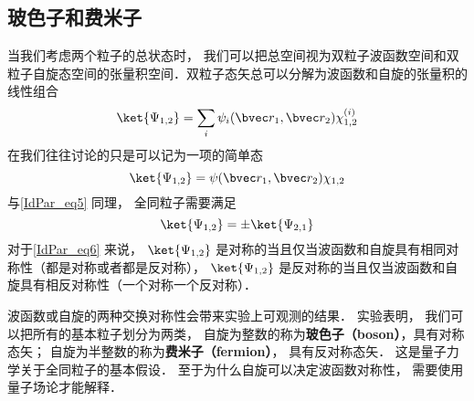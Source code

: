 \subsection{玻色子和费米子}
当我们考虑两个粒子的总状态时， 我们可以把总空间视为双粒子波函数空间和双粒子自旋态空间的张量积空间．双粒子态矢总可以分解为波函数和自旋的张量积的线性组合 %
\begin{equation}
\ket{\Psi_{1,2}} = \sum_i \psi_i(\bvec r_1, \bvec r_2) \chi^{(i)}_{1,2}
\end{equation}
在我们往往讨论的只是可以记为一项的简单态
\begin{equation}\label{IdPar_eq6}
\ket{\Psi_{1,2}} = \psi(\bvec r_1, \bvec r_2) \chi_{1,2}
\end{equation}
与\autoref{IdPar_eq5} 同理， 全同粒子需要满足
\begin{equation}\label{IdPar_eq4}
\ket{\Psi_{1,2}} = \pm \ket{\Psi_{2,1}}
\end{equation}
对于\autoref{IdPar_eq6} 来说， $\ket{\Psi_{1,2}}$ 是对称的当且仅当波函数和自旋具有相同对称性（都是对称或者都是反对称）， $\ket{\Psi_{1,2}}$ 是反对称的当且仅当波函数和自旋具有相反对称性（一个对称一个反对称）．

波函数或自旋的两种交换对称性会带来实验上可观测的结果． 实验表明， 我们可以把所有的基本粒子划分为两类， 自旋为整数的称为\textbf{玻色子（boson）}，具有对称态矢； 自旋为半整数的称为\textbf{费米子（fermion）}， 具有反对称态矢． 这是量子力学关于全同粒子的基本假设． 至于为什么自旋可以决定波函数对称性， 需要使用量子场论才能解释． %

